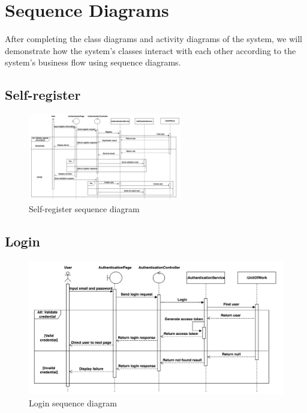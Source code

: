 \section{Sequence Diagrams}

After completing the class diagrams and activity diagrams of the system, we will  demonstrate how the system's classes interact with each other according to the system's business flow using sequence diagrams.

\subsection{Self-register}

\begin{figure}[H]
    \centering
    \includegraphics[angle=-90,width=0.6\textwidth]{Figures/self_register_seq.png}
    \caption{Self-register sequence diagram}
    \label{fig:self-registration-seq}
\end{figure}

\subsection{Login}
\begin{figure}[H]
    \centering
    \includegraphics[width=1\textwidth]{Figures/login_seq.png}
    \caption{Login sequence diagram}
    \label{fig:login-seq}
\end{figure}
